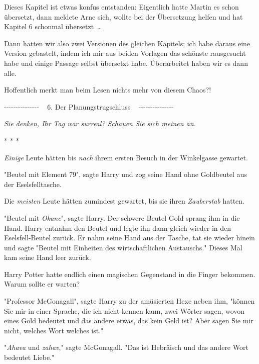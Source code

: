 

\hypertarget{der-planungstrugschluss}{%

Dieses Kapitel ist etwas konfus entstanden: Eigentlich hatte Martin es schon übersetzt, dann meldete Arne sich, wollte bei der Übersetzung helfen und hat Kapitel 6 schonmal übersetzt~…

Dann hatten wir also zwei Versionen des gleichen Kapitels; ich habe daraus eine Version gebastelt, indem ich mir aus beiden Vorlagen das schönste rausgesucht habe und einige Passage selbst übersetzt habe. Überarbeitet haben wir es dann alle.

Hoffentlich merkt man beim Lesen nichts mehr von diesem Chaos?!

-\/-\/-\/-\/-\/-\/-\/-\/-\/-\/-\/-\/-\/-\/- ~ 6. Der Planungstrugschluss ~ -\/-\/-\/-\/-\/-\/-\/-\/-\/-\/-\/-\/-\/-\/-

\emph{Sie denken, Ihr Tag war surreal? Schauen Sie sich meinen an.}

* * *

\emph{Einige} Leute hätten bis \emph{nach} ihrem ersten Besuch in der Winkelgasse gewartet.

"Beutel mit Element 79", sagte Harry und zog seine Hand ohne Goldbeutel aus der Eselsfelltasche.

Die \emph{meisten} Leute hätten zumindest gewartet, bis sie ihren \emph{Zauberstab} hatten.

"Beutel mit \emph{Okane}", sagte Harry. Der schwere Beutel Gold sprang ihm in die Hand. Harry entnahm den Beutel und legte ihn dann gleich wieder in den Eselsfell-Beutel zurück. Er nahm seine Hand aus der Tasche, tat sie wieder hinein und sagte "Beutel mit Einheiten des wirtschaftlichen Austauschs." Dieses Mal kam seine Hand leer zurück.

Harry Potter hatte endlich einen magischen Gegenstand in die Finger bekommen. Warum sollte er warten?

"Professor McGonagall", sagte Harry zu der amüsierten Hexe neben ihm, "können Sie mir in einer Sprache, die ich nicht kennen kann, zwei Wörter sagen, wovon eines Gold bedeutet und das andere etwas, das kein Geld ist? Aber sagen Sie mir nicht, welches Wort welches ist."

"\emph{Ahava} und \emph{zahav}," sagte McGonagall. "Das ist Hebräisch und das andere Wort bedeutet Liebe."

}
